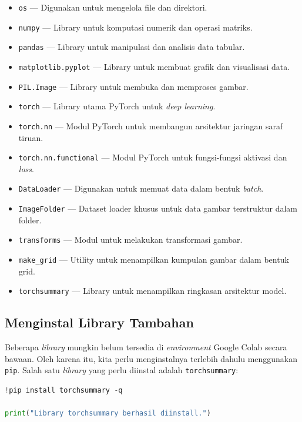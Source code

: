 \begin{itemize}
    \item \texttt{os} --- Digunakan untuk mengelola file dan direktori.
    \item \texttt{numpy} --- Library untuk komputasi numerik dan operasi matriks.
    \item \texttt{pandas} --- Library untuk manipulasi dan analisis data tabular.
    \item \texttt{matplotlib.pyplot} --- Library untuk membuat grafik dan visualisasi data.
    \item \texttt{PIL.Image} --- Library untuk membuka dan memproses gambar.
    \item \texttt{torch} --- Library utama PyTorch untuk \textit{deep learning}.
    \item \texttt{torch.nn} --- Modul PyTorch untuk membangun arsitektur jaringan saraf tiruan.
    \item \texttt{torch.nn.functional} --- Modul PyTorch untuk fungsi-fungsi aktivasi dan \textit{loss}.
    \item \texttt{DataLoader} --- Digunakan untuk memuat data dalam bentuk \textit{batch}.
    \item \texttt{ImageFolder} --- Dataset loader khusus untuk data gambar terstruktur dalam folder.
    \item \texttt{transforms} --- Modul untuk melakukan transformasi gambar.
    \item \texttt{make\_grid} --- Utility untuk menampilkan kumpulan gambar dalam bentuk grid.
    \item \texttt{torchsummary} --- Library untuk menampilkan ringkasan arsitektur model.
\end{itemize}

\subsection{Menginstal Library Tambahan}

Beberapa \textit{library} mungkin belum tersedia di \textit{environment} Google Colab secara bawaan. Oleh karena itu, kita perlu menginstalnya terlebih dahulu menggunakan \texttt{pip}. Salah satu \textit{library} yang perlu diinstal adalah \texttt{torchsummary}:

\begin{lstlisting}[language=Python, caption=Menginstal library torchsummary]
!pip install torchsummary -q

print("Library torchsummary berhasil diinstall.")
\end{lstlisting}

